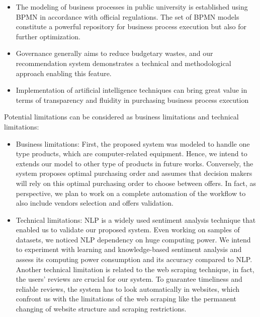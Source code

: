 \documentclass[preprint,3p,onecolumn]{elsarticle}
\begin{document}
\begin{itemize}
    \item The modeling of business processes in public university is established using BPMN in accordance with official regulations. The set of BPMN models constitute a powerful repository for business process execution but also for further optimization.
    \item Governance generally aims to reduce budgetary wastes, and our recommendation system demonstrates a technical and methodological approach enabling this feature.
    \item Implementation of artificial intelligence techniques can bring great value in terms of transparency and fluidity in purchasing business process execution
\end{itemize}


\par Potential limitations can be considered as business limitations and technical limitations:
  
\begin{itemize}
    \item Business limitations: First, the proposed system was modeled to handle one type products, which are computer-related equipment. Hence, we intend to extends our model to other type of products in future works. Conversely, the system proposes optimal purchasing order and assumes that decision makers will rely on this optimal purchasing order to choose between offers. In fact, as perspective, we plan to work on a complete automation of the workflow to also include vendors selection and offers validation.

    \item Technical limitations: NLP is a widely used sentiment analysis technique that enabled us to validate our proposed system. Even working on samples of datasets, we noticed NLP dependency on huge computing power. We intend to experiment with learning and knowledge-based sentiment analysis and assess its computing power consumption and its accuracy compared to NLP. Another technical limitation is related to the web scraping technique, in fact, the users’ reviews are crucial for our system. To guarantee timeliness and reliable reviews, the system has to look automatically in websites, which confront us with the limitations of the web scraping like the permanent changing of website structure and scraping restrictions.
\end{itemize}



\end{document}
